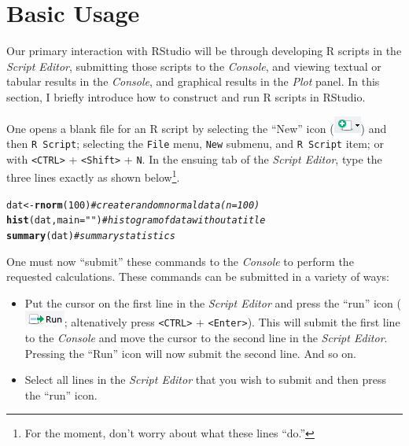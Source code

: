 \documentclass{article}\usepackage[]{graphicx}\usepackage[]{color}
\makeatletter
\newcommand{\hlnum}[1]{\textcolor[rgb]{0.686,0.059,0.569}{#1}}%
\newcommand{\hlstr}[1]{\textcolor[rgb]{0.192,0.494,0.8}{#1}}%
\newcommand{\hlcom}[1]{\textcolor[rgb]{0.678,0.584,0.686}{\textit{#1}}}%
\newcommand{\hlstd}[1]{\textcolor[rgb]{0.345,0.345,0.345}{#1}}%
\newcommand{\hlkwb}[1]{\textcolor[rgb]{0.69,0.353,0.396}{#1}}%
\newcommand{\hlkwc}[1]{\textcolor[rgb]{0.333,0.667,0.333}{#1}}%
\newcommand{\hlkwd}[1]{\textcolor[rgb]{0.737,0.353,0.396}{\textbf{#1}}}%
\newenvironment{kframe}{%
 \def\at@end@of@kframe{}%
 \ifinner\ifhmode%
  \def\at@end@of@kframe{\end{minipage}}%
  \begin{minipage}{\columnwidth}%
 \fi\fi%
 \def\FrameCommand##1{\hskip\@totalleftmargin \hskip-\fboxsep
 \colorbox{shadecolor}{##1}\hskip-\fboxsep
     \hskip-\linewidth \hskip-\@totalleftmargin \hskip\columnwidth}%
 \MakeFramed {\advance\hsize-\width
   \@totalleftmargin\z@ \linewidth\hsize
   \@setminipage}}%
 {\par\unskip\endMakeFramed%
 \at@end@of@kframe}
\newenvironment{knitrout}{}{} %
\makeatother
\begin{document}
\section{Basic Usage}
Our primary interaction with RStudio will be through developing R scripts in the \textit{Script Editor}, submitting those scripts to the \textit{Console}, and viewing textual or tabular results in the \textit{Console}, and graphical results in the \textit{Plot} panel.  In this section, I briefly introduce how to construct and run R scripts in RStudio.

One opens a blank file for an R script by selecting the ``New'' icon (\includegraphics[scale=0.8]{Figs/RStudio_Icon_New.png}) and then \texttt{R Script}; selecting the \texttt{File} menu, \texttt{New} submenu, and \texttt{R Script} item; or with \verb+<CTRL>+ + \verb+<Shift>+ + \verb+N+.  In the ensuing tab of the \textit{Script Editor}, type the three lines exactly as shown below\footnote{For the moment, don't worry about what these lines ``do.''}.

\begin{knitrout}
\color{fgcolor}\begin{kframe}
\begin{alltt}
\hlstd{dat} \hlkwb{<-} \hlkwd{rnorm}\hlstd{(}\hlnum{100}\hlstd{)}    \hlcom{# create random normal data (n=100)}
\hlkwd{hist}\hlstd{(dat,}\hlkwc{main}\hlstd{=}\hlstr{""}\hlstd{)}    \hlcom{# histogram of data without a title}
\hlkwd{summary}\hlstd{(dat)}         \hlcom{# summary statistics}
\end{alltt}
\end{kframe}
\end{knitrout}

One must now ``submit'' these commands to the \textit{Console} to perform the requested calculations.  These commands can be submitted in a variety of ways:

\begin{itemize}
  \item Put the cursor on the first line in the \textit{Script Editor} and press the ``run'' icon (\includegraphics[scale=0.8]{Figs/RStudio_Icon_Run.png}; altenatively press \verb+<CTRL>+ + \verb+<Enter>+).  This will submit the first line to the \textit{Console} and move the cursor to the second line in the \textit{Script Editor}.  Pressing the ``Run'' icon will now submit the second line.  And so on.
  \item Select all lines in the \textit{Script Editor} that you wish to submit and then press the ``run'' icon.
\end{itemize}
\end{document}

